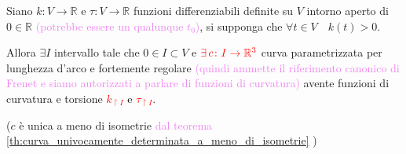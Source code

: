         \begin{teorema}
        \mbox{}

        Siano $k \colon V \to \mathbb{R}$ e $\tau \colon V \to \mathbb{R}$ funzioni differenziabili definite su $V$ intorno aperto di $0 \in \mathbb{R}$
        \textcolor{violet}{(potrebbe essere un qualunque $t_0$)}, 
        si supponga che $\forall t \in V \quad k(t) > 0$.

        Allora $\exists I$ intervallo tale che $0 \in I \subset V$ e $\textcolor{red}{\exists \, c \colon I \to \mathbb{R}^3}$ curva parametrizzata per 
        lunghezza d'arco e fortemente regolare \textcolor{violet}{(quindi ammette il riferimento 
        canonico di Frenet e siamo autorizzati a parlare di funzioni di curvatura)} avente funzioni di curvatura e torsione \textcolor{red}{ $k_{\restriction{I}}$ \textcolor{black}{e} $\tau_{\restriction{I}}$}.
        
        \textcolor{blu}{($c$ è unica a meno di isometrie \textcolor{violet}{dal teorema \ref{th:curva_univocamente_determinata_a_meno_di_isometrie}} )}
        \end{teorema}
